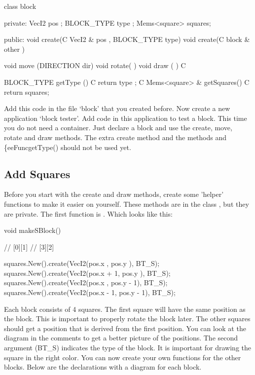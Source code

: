 \begin{code}
class block
{
private:
   VecI2        pos    ;
   BLOCK_TYPE   type   ;  
   Mems<square> squares;
   
public:
   void create(C VecI2 & pos  , BLOCK_TYPE type) { }
   void create(C block & other                 ) { }
	
   void move  (DIRECTION dir)   { }
   void rotate(             )   { }
   void draw  (             ) C { }
	
   BLOCK_TYPE       getType   () C { return type   ; }
	 C Mems<square> & getSquares() C { return squares; }
}
\end{code}

Add this code in the file `block' that you created before. Now create a new application `block tester'. Add code in this application to test a block. This time you do not need a container. Just declare a block and use the create, move, rotate and draw methods. The extra create method and the methods  and \{eeFunc{getType()} should not be used yet.

\subsection{Add Squares}
Before you start with the create and draw methods, create some 'helper' functions to make it easier on yourself. These methods are in the class , but they are private. The first function is . Which looks like this:

\begin{code}
void makeSBlock()
{
	//    [0][1]
	// [3][2] 
	
	squares.New().create(VecI2(pos.x    , pos.y    ), BT_S);
	squares.New().create(VecI2(pos.x + 1, pos.y    ), BT_S);
	squares.New().create(VecI2(pos.x    , pos.y - 1), BT_S);
	squares.New().create(VecI2(pos.x - 1, pos.y - 1), BT_S);     
}
\end{code}

Each block consists of 4 squares. The first square will have the same position as the block. This is important to properly rotate the block later. The other squares should get a position that is derived from the first position. You can look at the diagram in the comments to get a better picture of the positions. The second argument (BT\_S) indicates the type of the block. It is important for drawing the square in the right color. You can now create your own functions for the other blocks. Below are the declarations with a diagram for each block.

